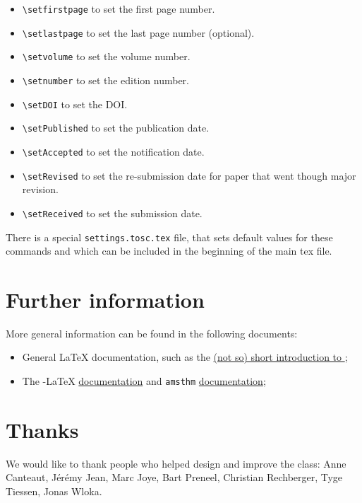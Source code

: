 \documentclass{iacrcc}
\begin{document}
\begin{itemize}
\item \texttt{\textbackslash{}setfirstpage} to set the first page number.
\item \texttt{\textbackslash{}setlastpage} to set the last page number (optional).
\item \texttt{\textbackslash{}setvolume} to set the volume number.
\item \texttt{\textbackslash{}setnumber} to set the edition number.
\item \texttt{\textbackslash{}setDOI} to set the DOI\@.
\item \texttt{\textbackslash{}setPublished} to set the publication date.
\item \texttt{\textbackslash{}setAccepted} to set the notification date.
\item \texttt{\textbackslash{}setRevised} to set the re-submission date for paper that went though major revision.
\item \texttt{\textbackslash{}setReceived} to set the submission date.
\end{itemize}

There is a special \texttt{settings.tosc.tex} file, that sets default values for these commands
and which can be included in the beginning of the main tex file.

\section{Further information}

More general information can be found in the following documents:
\begin{itemize}
\item General \LaTeX{} documentation, such as the
  \href{http://mirrors.ctan.org/info/lshort/english/lshort.pdf}{(not
    so) short introduction to \LaTeXe};
\item The \AmS-\LaTeX{}
  \href{http://mirrors.ctan.org/macros/latex/required/amslatex/math/amsldoc.pdf}{documentation}
  and \texttt{amsthm} \href{ftp://ftp.ams.org/pub/tex/doc/amscls/amsthdoc.pdf}{documentation};
\end{itemize}

\section*{Thanks}
We would like to thank people who helped design and improve the class:
Anne Canteaut,
Jérémy Jean,
Marc Joye,
Bart Preneel,
Christian Rechberger,
Tyge Tiessen,
Jonas Wloka.


\renewcommand{\refname}{Sample References}

\end{document}
